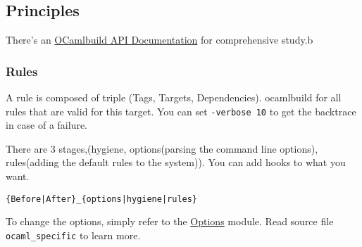\documentclass[11pt]{article}
\begin{document}
\subsection*{Principles}
\label{sec-1-12}


   There's an \href{http://www.seas.upenn.edu/~hongboz/hongbo_zhang_files/ob/}{OCamlbuild API Documentation} for comprehensive study.b
\subsubsection*{Rules}
\label{sec-1-12-1}

    A rule is composed of triple (Tags, Targets,
    Dependencies). ocamlbuild for all rules that are valid for this
    target.  You can set \texttt{-verbose 10} to get the backtrace in
    case of a failure.

    There are 3 stages,(hygiene, options(parsing the command line
    options), rules(adding the default rules to the system)). You
    can add hooks to what you want.


\begin{verbatim}
{Before|After}_{options|hygiene|rules}
\end{verbatim}

    To change the options, simply refer to the \href{http://www.seas.upenn.edu/~hongboz/hongbo_zhang_files/ob/Options.html}{Options} module. Read
    source file \texttt{ocaml\_specific} to learn more.
\end{document}
